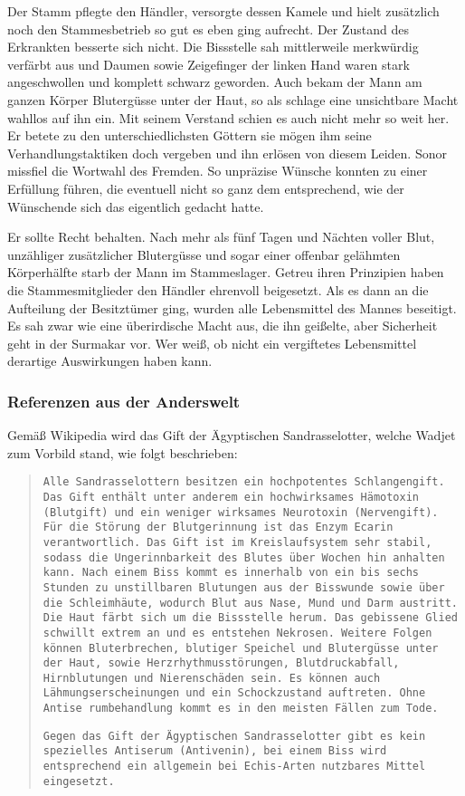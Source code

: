 	Der Stamm pflegte den Händler, versorgte dessen Kamele und hielt zusätzlich noch den Stammesbetrieb so gut es eben ging aufrecht. Der Zustand des Erkrankten besserte sich nicht. Die Bissstelle sah mittlerweile merkwürdig verfärbt aus und Daumen sowie Zeigefinger der linken Hand waren stark angeschwollen und komplett schwarz geworden.
	Auch bekam der Mann am ganzen Körper Blutergüsse unter der Haut, so als schlage eine unsichtbare Macht wahllos auf ihn ein.
	Mit seinem Verstand schien es auch nicht mehr so weit her. 
	Er betete zu den unterschiedlichsten Göttern sie mögen ihm seine Verhandlungstaktiken doch vergeben und ihn erlösen von diesem Leiden.
	Sonor missfiel die Wortwahl des Fremden. 
	So unpräzise Wünsche konnten zu einer Erfüllung führen, die eventuell nicht so ganz dem entsprechend, wie der Wünschende sich das eigentlich gedacht hatte.
	 
	Er sollte Recht behalten. 
	Nach mehr als fünf Tagen und Nächten voller Blut, unzähliger zusätzlicher Blutergüsse und sogar einer offenbar gelähmten Körperhälfte starb der Mann im Stammeslager. 
	Getreu ihren Prinzipien haben die Stammesmitglieder den Händler ehrenvoll beigesetzt.
	Als es dann an die Aufteilung der Besitztümer ging, wurden alle Lebensmittel des Mannes beseitigt. 
	Es sah zwar wie eine überirdische Macht aus, die ihn geißelte, aber Sicherheit geht in der Surmakar vor.
	Wer weiß, ob nicht ein vergiftetes Lebensmittel derartige Auswirkungen haben kann. 
	

	\subsubsection{Referenzen aus der Anderswelt}
	
	Gemäß Wikipedia wird das Gift der Ägyptischen Sandrasselotter, welche Wadjet zum Vorbild stand, wie folgt beschrieben:
	
	\begin{quotation}
		\texttt{Alle Sandrasselottern besitzen ein hochpotentes Schlangengift. Das Gift enthält	unter anderem ein hochwirksames Hämotoxin (Blutgift) und ein weniger wirksames Neurotoxin (Nervengift). Für die Störung der Blutgerinnung ist das Enzym Ecarin verantwortlich. Das Gift ist im Kreislaufsystem sehr stabil, sodass die	Ungerinnbarkeit des Blutes über Wochen hin anhalten kann. Nach einem Biss kommt es innerhalb von ein bis sechs Stunden zu unstillbaren Blutungen aus der
		Bisswunde sowie über die Schleimhäute, wodurch Blut aus Nase, Mund und Darm
		austritt. Die Haut färbt sich um die Bissstelle herum. Das gebissene Glied
		schwillt extrem an und es entstehen Nekrosen. Weitere Folgen können
		Bluterbrechen, blutiger Speichel und Blutergüsse unter der Haut, sowie
		Herzrhythmusstörungen, Blutdruckabfall, Hirnblutungen und Nierenschäden sein. Es
		können auch Lähmungserscheinungen und ein Schockzustand auftreten. Ohne
		Antise rumbehandlung kommt es in den meisten Fällen zum Tode.}

		\texttt{Gegen das Gift der Ägyptischen Sandrasselotter gibt es kein spezielles Antiserum (Antivenin), bei einem Biss wird entsprechend ein allgemein bei Echis-Arten	nutzbares Mittel eingesetzt.}
\end{quotation}


